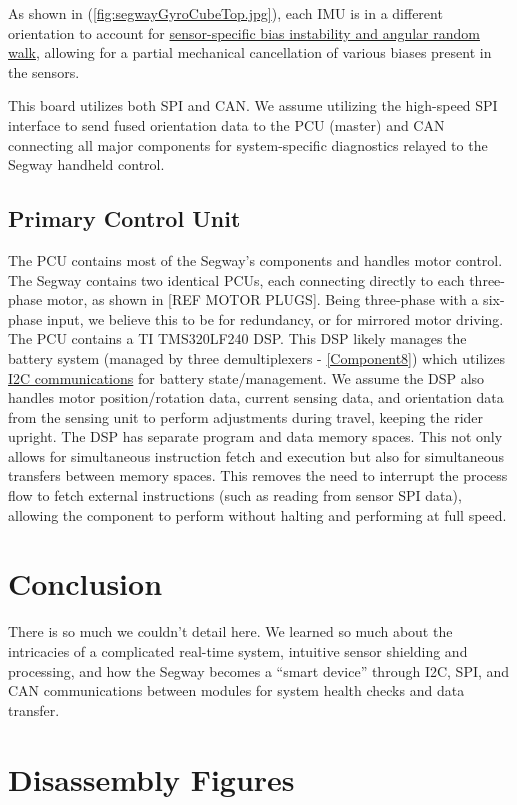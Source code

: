\documentclass[]{formalLabReport}
\begin{document}
As shown in (\ref{fig:segwayGyroCubeTop.jpg}), each IMU is in a different orientation to account for \href{https://base.xsens.com/hc/en-us/articles/209611089-Understanding-Sensor-Bias-offset-}{sensor-specific bias instability and angular random walk}, allowing for a partial mechanical cancellation of various biases present in the sensors. 

This board utilizes both SPI and CAN. We assume utilizing the high-speed SPI interface to send fused orientation data to the PCU (master) and CAN connecting all major components for system-specific diagnostics relayed to the Segway handheld control.

\subsection{Primary Control Unit}
The PCU contains most of the Segway’s components and handles motor control. The Segway contains two identical PCUs, each connecting directly to each three-phase motor, as shown in [REF MOTOR PLUGS]. Being three-phase with a six-phase input, we believe this to be for redundancy, or for mirrored motor driving. The PCU contains a TI TMS320LF240 DSP. This DSP likely manages the battery system (managed by three demultiplexers - \ref{Component8}) which utilizes \href{https://github.com/martinbogo/pt-battery-diagnostics}{I2C communications} for battery state/management. We assume the DSP also handles motor position/rotation data, current sensing data, and orientation data from the sensing unit to perform adjustments during travel, keeping the rider upright. The DSP has separate program and data memory spaces. This not only allows for simultaneous instruction fetch and execution but also for simultaneous transfers between memory spaces. This removes the need to interrupt the process flow to fetch external instructions (such as reading from sensor SPI data), allowing the component to perform without halting and performing at full speed.

\section{Conclusion}
There is so much we couldn’t detail here. We learned so much about the intricacies of a complicated real-time system, intuitive sensor shielding and processing, and how the Segway becomes a “smart device” through I2C, SPI, and CAN communications between modules for system health checks and data transfer.

\section{Disassembly Figures}
\end{document}
